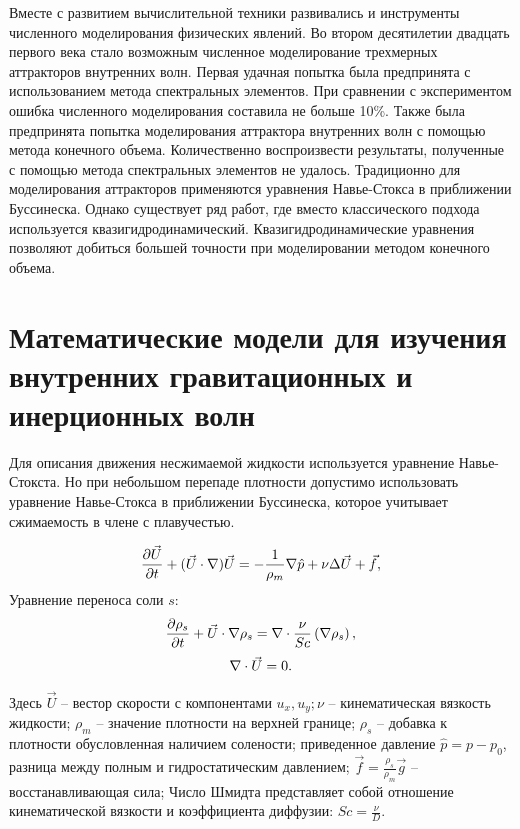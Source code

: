 Вместе с развитием вычислительной техники развивались и инструменты численного моделирования физических явлений. Во втором десятилетии двадцать первого века стало возможным численное моделирование трехмерных аттракторов внутренних волн. Первая удачная попытка была предпринята с использованием метода спектральных элементов\cite{Brouzet2016,Brouzet_2016}. При сравнении с экспериментом ошибка численного моделирования составила не больше 10\%. Также была предпринята попытка моделирования аттрактора внутренних волн с помощью метода конечного объема\cite{Brouzet2014}. Количественно воспроизвести результаты, полученные с помощью метода спектральных элементов не удалось.
Традиционно для моделирования аттракторов применяются уравнения Навье-Стокса в приближении Буссинеска. Однако существует ряд работ, где вместо классического подхода используется квазигидродинамический\cite{ElizarBook}. Квазигидродинамические уравнения позволяют добиться большей точности\cite{Kraposhin20182} при моделировании методом конечного объема.


\section{Математические модели для изучения внутренних гравитационных и инерционных волн}

Для описания движения несжимаемой жидкости используется уравнение Навье-Стокста. Но при небольшом перепаде плотности допустимо использовать уравнение Навье-Стокса в приближении Буссинеска, которое учитывает сжимаемость в члене с плавучестью.

\begin{equation}
 \large \frac{\partial \vec U}{\partial t} + (\vec U \cdot \nabla) \vec U = - \frac{1}{\rho_m} \nabla \hat p + \nu \Delta \vec U  + \vec f,
 \label{eq:momClassic}
\end{equation}
Уравнение переноса соли $s$:
\begin{equation}
 \large \frac{\partial \rho_s}{\partial t} + \vec U \cdot \nabla \rho_s  = \nabla \cdot \frac{\nu}{Sc} \left ( \nabla \rho_s \right ),
 \label{eq:transClassic}
\end{equation}
\begin{equation}
 \large \nabla \cdot \vec U  = 0.
 \label{eq:contClassic}
\end{equation}

Здесь $\vec{U}$ -- вестор скорости с компонентами $u_x,u_y; \nu$ -- кинематическая вязкость жидкости; $\rho_m$ -- значение плотности на верхней границе; $\rho_s$ -- добавка к плотности обусловленная наличием солености; приведенное давление $\hat{p}=p-p_0$, разница между полным и гидростатическим давлением; $\vec{f}=\frac{\rho_s}{\rho_m} \vec{g}$ -- восстанавливающая сила; Число Шмидта представляет собой отношение кинематической вязкости и коэффициента диффузии:  $Sc = \frac{\nu}{D}$. 

